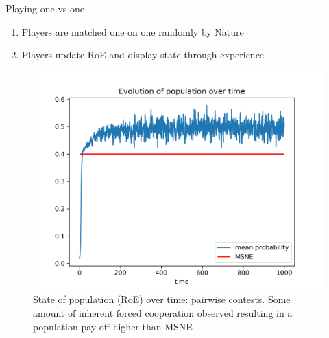 \documentclass{IFES-beamer}
\begin{document}
        \begin{frame}{Playing one vs one}
        \begin{enumerate}
            \item Players are matched one on one randomly by Nature
            \item Players update RoE and display state through experience
        \end{enumerate}
            \begin{figure}[H]
                \centering
                \includegraphics[scale=0.4]{Images/pop_state_uni.png}
                \caption{State of population (RoE) over time: pairwise contests. Some amount of inherent forced cooperation observed resulting in a population pay-off higher than MSNE}
            \end{figure}
        \end{frame}
                
\end{document}
